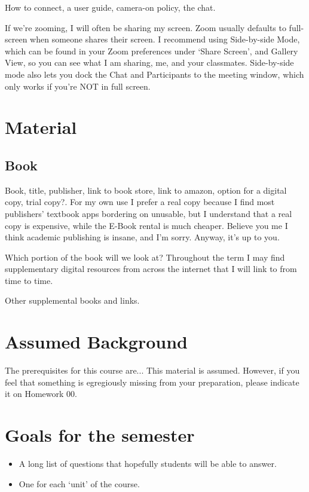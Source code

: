 How to connect, a user guide, camera-on policy, the chat.

If we're zooming, I will often be sharing my screen.  Zoom usually defaults to full-screen when someone shares their screen.  I recommend using Side-by-side Mode, which can be found in your Zoom preferences under `Share Screen', and Gallery View, so you can see what I am sharing, me, and your classmates.  Side-by-side mode also lets you dock the Chat and Participants to the meeting window, which only works if you're NOT in full screen.

\section{Material}

\subsection*{Book}

Book, title, publisher, link to book store, link to amazon, option for a digital copy, trial copy?.
For my own use I prefer a real copy because I find most publishers' textbook apps bordering on unusable, but I understand that a real copy is expensive, while the E-Book rental is much cheaper.
Believe you me I think academic publishing is insane, and I'm sorry.
Anyway, it's up to you.

Which portion of the book will we look at?
Throughout the term I may find supplementary digital resources from across the internet that I will link to from time to time.

Other supplemental books and links.

\section*{Assumed Background}

The prerequisites for this course are...
This material is assumed.
However, if you feel that something is egregiously missing from your preparation, please indicate it on Homework 00.

\section*{Goals for the semester}

\begin{itemize}

	\item A long list of questions that hopefully students will be able to answer.
	
	\item One for each `unit' of the course.

\end{itemize}


